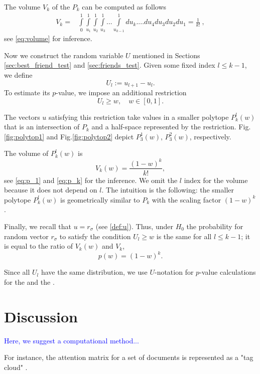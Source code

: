 \documentclass{llncs}
\begin{document}
The volume $V_k$ of the $P_k$ can be computed as follows
\begin{eqnarray*}
V_k = &\displaystyle \int\limits_0^1\int\limits_{u_1}^1\int\limits_{u_2}^1\int\limits_{u_3}^1...\int\limits_{u_{k-1}}^1 du_k....du_4 du_3 du_2 du_1 =  \frac{1}{k!}~,
\end{eqnarray*}
see \eqref{eq:volume} for inference.

Now we construct the random variable $U$ mentioned in Sections \ref{sec:best_friend_test} and \ref{sec:friends_test}. Given some fixed index $l\leq k-1$, we define
\[
U_{l} := u_{l+1} - u_{l}. 
\]
To estimate its $p$-value, we impose an additional restriction
\[
U_{l} \ge w, \quad w \in [0, 1].
\]

The vectors $u$ satisfying this restriction take values in a smaller polytope $P^{l}_{k}(w)$ that is an intersection of $P_{k}$ and a half-space represented by the restriction.
Fig.\ref{fig:polytop1} and Fig.\ref{fig:polytop2} depict $P^{1}_{3}(w)$, $P^{2}_{3}(w)$, respectively. 

The volume of $P^{l}_{k}(w)$ is 
\begin{equation}
V_{k}(w) = \frac{(1-w)^k}{k!},
\end{equation}
see \eqref{eq:p_1} and \eqref{eq:p_k} for the inference. We omit the $l$ index for the volume because it does not depend on $l$. The intuition is the following: the smaller polytope $P^{l}_{k}(w)$ is geometrically similar to $P_{k}$ with the scaling factor $(1-w)^k$. 

Finally, we recall that $u = r_{\sigma}$ (see \eqref{def:u}). Thus, under $H_0$ the probability for random vector $r_{\sigma}$ to satisfy the condition $U_{l} \ge w$ is the same for all $l\leq k-1$; it is equal to the ratio of $V_{k}(w)$ and $V_k$,
\[
p(w) = (1-w)^k.
\]

Since all $U_l$ have the same distribution, we use $U$-notation for $p$-value calculations for the  and the .


\section{Discussion}
\textcolor{blue}{Here, we suggest a computational method...}


\textcolor{airforceblue}{For instance, the attention matrix for a set of documents is represented as a "tag cloud" \cite{venetis2011selection}}. 
\end{document}
